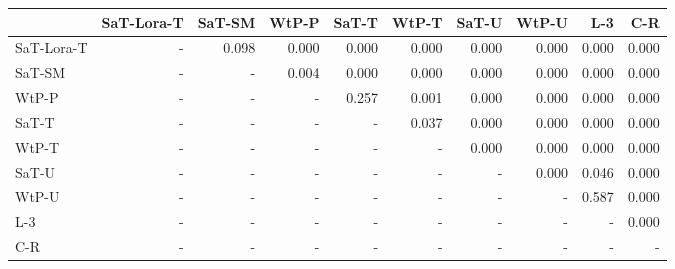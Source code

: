 \begin{tabular}{lrrrrrrrrr}
\toprule
 & SaT-Lora-T & SaT-SM & WtP-P & SaT-T & WtP-T & SaT-U & WtP-U & L-3 & C-R \\
\midrule
SaT-Lora-T & - & 0.098 & 0.000 & 0.000 & 0.000 & 0.000 & 0.000 & 0.000 & 0.000 \\
SaT-SM & - & - & 0.004 & 0.000 & 0.000 & 0.000 & 0.000 & 0.000 & 0.000 \\
WtP-P & - & - & - & 0.257 & 0.001 & 0.000 & 0.000 & 0.000 & 0.000 \\
SaT-T & - & - & - & - & 0.037 & 0.000 & 0.000 & 0.000 & 0.000 \\
WtP-T & - & - & - & - & - & 0.000 & 0.000 & 0.000 & 0.000 \\
SaT-U & - & - & - & - & - & - & 0.000 & 0.046 & 0.000 \\
WtP-U & - & - & - & - & - & - & - & 0.587 & 0.000 \\
L-3 & - & - & - & - & - & - & - & - & 0.000 \\
C-R & - & - & - & - & - & - & - & - & - \\
\bottomrule
\end{tabular}

